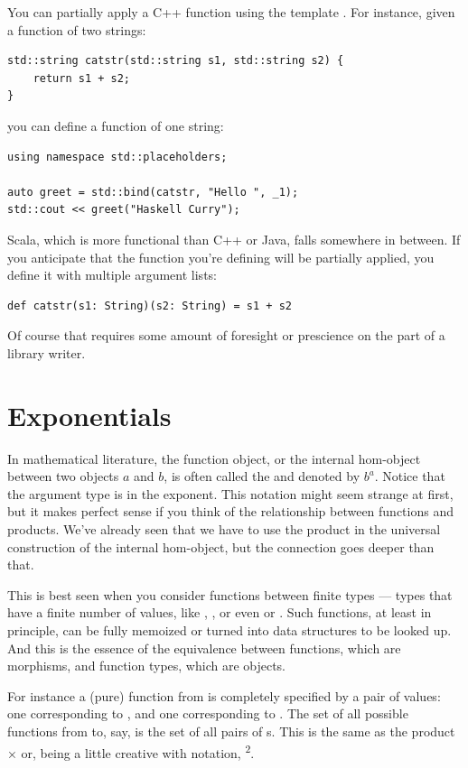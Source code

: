 You can partially apply a C++ function using the template
. For instance, given a function of two strings:

\begin{Verbatim}
std::string catstr(std::string s1, std::string s2) {
    return s1 + s2;
}
\end{Verbatim}
you can define a function of one string:

\begin{Verbatim}
using namespace std::placeholders;

auto greet = std::bind(catstr, "Hello ", _1);
std::cout << greet("Haskell Curry");
\end{Verbatim}
Scala, which is more functional than C++ or Java, falls somewhere in
between. If you anticipate that the function you're defining will be
partially applied, you define it with multiple argument lists:

\begin{Verbatim}
def catstr(s1: String)(s2: String) = s1 + s2
\end{Verbatim}
Of course that requires some amount of foresight or prescience on the
part of a library writer.

\section{Exponentials}

In mathematical literature, the function object, or the internal
hom-object between two objects $a$ and $b$, is often
called the  and denoted by $b^{a}$. Notice that
the argument type is in the exponent. This notation might seem strange
at first, but it makes perfect sense if you think of the relationship
between functions and products. We've already seen that we have to use
the product in the universal construction of the internal hom-object,
but the connection goes deeper than that.

This is best seen when you consider functions between finite types ---
types that have a finite number of values, like ,
, or even  or . Such functions,
at least in principle, can be fully memoized or turned into data
structures to be looked up. And this is the essence of the equivalence
between functions, which are morphisms, and function types, which are
objects.

For instance a (pure) function from  is completely
specified by a pair of values: one corresponding to , and
one corresponding to . The set of all possible functions
from  to, say,  is the set of all pairs of
s. This is the same as the product  ×  or,
being a little creative with notation, \textsuperscript{2}.

